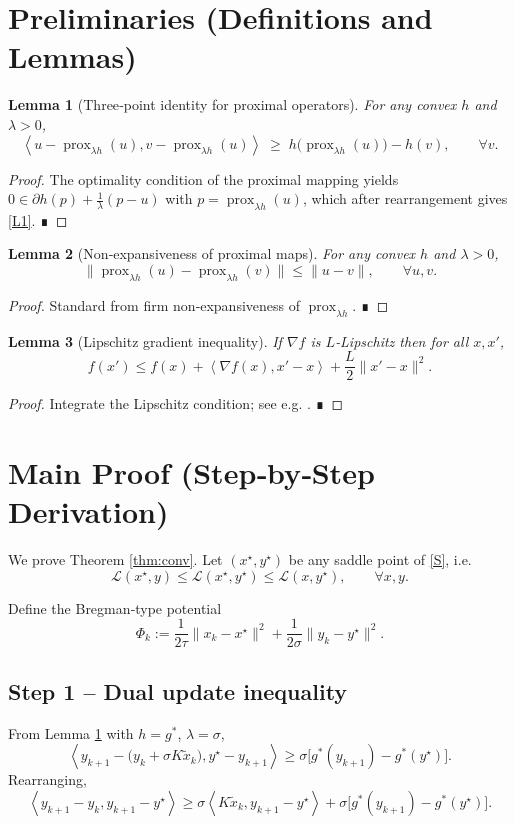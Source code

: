 \documentclass{article}
\newtheorem{lemma}{Lemma}
\newcommand{\prox}{\operatorname{prox}}
\newcommand{\inner}[2]{\left\langle #1,#2\right\rangle}
\begin{document}
\newpage
\section*{Preliminaries (Definitions and Lemmas)}
\begin{lemma}[Three‑point identity for proximal operators]\label{lem:three}
For any convex $h$ and $\lambda>0$,
\[
\inner{u-\prox_{\lambda h}(u)}{v-\prox_{\lambda h}(u)}
\;\ge\;
h\bigl(\prox_{\lambda h}(u)\bigr)-h(v),\qquad\forall v.
\tag{L1}
\]
\end{lemma}
\begin{proof}
The optimality condition of the proximal mapping yields
$0\in\partial h(p)+\frac1\lambda(p-u)$ with $p=\prox_{\lambda h}(u)$,
which after rearrangement gives \eqref{L1}. ∎
\end{proof}
\begin{lemma}[Non‑expansiveness of proximal maps]\label{lem:nonexp}
For any convex $h$ and $\lambda>0$,
\[
\bigl\|\prox_{\lambda h}(u)-\prox_{\lambda h}(v)\bigr\|
\le \|u-v\|,\qquad\forall u,v.
\tag{L2}
\]
\end{lemma}
\begin{proof}
Standard from firm non‑expansiveness of $\prox_{\lambda h}$. ∎
\end{proof}
\begin{lemma}[Lipschitz gradient inequality]\label{lem:lipschitz}
If $\nabla f$ is $L$‑Lipschitz then for all $x,x'$,
\[
f(x')\le f(x)+\inner{\nabla f(x)}{x'-x}+\frac{L}{2}\|x'-x\|^{2}.
\tag{L3}
\]
\end{lemma}
\begin{proof}
Integrate the Lipschitz condition; see e.g. \cite{Nesterov2004}. ∎
\end{proof}

\section*{Main Proof (Step‑by‑Step Derivation)}
We prove Theorem \ref{thm:conv}. Let $(x^{\star},y^{\star})$ be any saddle point of \eqref{S}, i.e.
\[
\mathcal{L}(x^{\star},y)\le \mathcal{L}(x^{\star},y^{\star})\le \mathcal{L}(x,y^{\star}),\qquad\forall x,y.
\tag{P1}
\]

Define the Bregman‑type potential
\[
\Phi_{k}:=\frac{1}{2\tau}\|x_{k}-x^{\star}\|^{2}
+\frac{1}{2\sigma}\|y_{k}-y^{\star}\|^{2}.
\tag{P2}
\]

\subsection*{Step 1 – Dual update inequality}
From Lemma \ref{lem:three} with $h=g^{*}$, $\lambda=\sigma$,
\[
\inner{y_{k+1}-\bigl(y_{k}+\sigma K\tilde x_{k}\bigr)}{y^{\star}-y_{k+1}}
\ge
\sigma\bigl[g^{*}(y_{k+1})-g^{*}(y^{\star})\bigr].
\tag{S1}
\]
Rearranging,
\[
\inner{y_{k+1}-y_{k}}{y_{k+1}-y^{\star}}
\ge
\sigma\inner{K\tilde x_{k}}{y_{k+1}-y^{\star}}
+\sigma\bigl[g^{*}(y_{k+1})-g^{*}(y^{\star})\bigr].
\tag{S2}
\]
\end{document}
